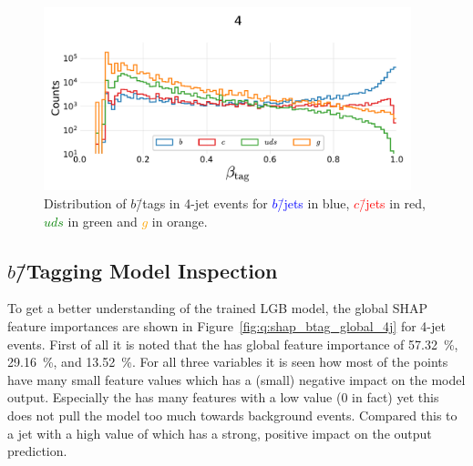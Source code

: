 \vspace{-5mm}
\begin{figure}[h!]
  \centerfloat
  \includegraphics[width=0.95\textwidth, trim=15 15 15 50, clip]{figures/quarks/btag_scores_histogram_-njet=4-down_sample=1.00-ML_vars=vertex-selection=b-ejet_min=4-n_iter_RS_lgb=99-n_iter_RS_xgb=9-cdot_cut=0.90-version=19.pdf}
  \vspace{2mm}
  \caption[Distribution of $b$\=/Tags in 4-Jet Events]
          {Distribution of $b$\=/tags in 4-jet events for \textcolor{blue}{$b$\=/jets} in blue, \textcolor{red}{$c$\=/jets} in red, \textcolor{green}{$uds$} in green and \textcolor{orange}{$g$} in orange.} 
  \label{fig:q:btag_histogram_4j}
\end{figure}
\vspace{-5mm}

\subsection{$b$\=/Tagging Model Inspection}

To get a better understanding of the trained LGB model, the global SHAP feature importances are shown in Figure~\ref{fig:q:shap_btag_global_4j} for 4-jet events. First of all it is noted that the  has global feature importance of \SI{57.32}{\percent},  \SI{29.16}{\percent}, and  \SI{13.52}{\percent}. For all three variables it is seen how most of the points have many small feature values which has a (small) negative impact on the model output. Especially the  has many features with a low value (\num{0} in fact) yet this does not pull the model too much towards background events. Compared this to a jet with a high value of  which has a strong, positive impact on the output prediction.

